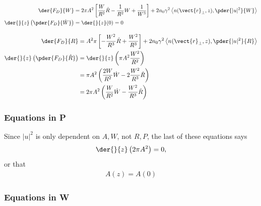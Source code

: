 \begin{equation}
\begin{split}
    \der{F_{D}}{W}  &=  2 \pi A^2 \left[\frac{W}{R^2} \dot{R} -  \frac{1}{R^2}W + \frac{1}{W^3}\right] +  2n_0 \gamma^2 \left< n(\vect{r}_{\perp},z),\pder{|u|^2}{W}  \right> \\
\der{}{z}\left(\pder{F_{D}}{\dot{W}}\right) &= \der{}{z}(0) = 0 \\
\end{split}
\end{equation}


\begin{equation}
\begin{split}
    \der{F_{D}}{R}  &=  A^2 \pi \left[-\frac{W^2}{R^3}\dot{R} + \frac{W^2}{R^3}\right] +  2n_0 \gamma^2 \left< n(\vect{r}_{\perp},z),\pder{|u|^2}{R}  \right> \\
\der{}{z}\left(\pder{F_{D}}{\dot{R}}\right) &= \der{}{z}\left(  \pi A^2 \frac{W^2}{R^2}\right)\\
&= \pi A^2 \left(\frac{2W }{R^2} \dot{W} - 2\frac{W^2}{R^3} \dot{R}\right)\\
&= 2\pi A^2 \left(\frac{W}{R^2} \dot{W} - \frac{W^2}{R^3} \dot{R}\right)\\
\end{split}
\end{equation}


\subsubsection{Equations in P}
Since $|u|^2$ is only dependent on $A,W$, not $R,P$, the last of these equations says
\begin{equation}
\begin{split}
    \der{}{z}\left( 2 \pi A^2 \right) = 0,
\end{split}
\end{equation}
or that
\begin{equation}
\begin{split}
    A(z) = A(0)
\end{split}
\end{equation}

\subsubsection{Equations in W}


